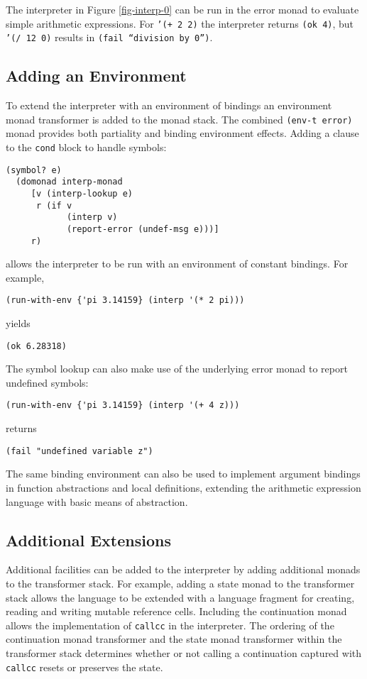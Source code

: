 \documentclass[natbib,10pt]{sigplanconf}
\begin{document}
The interpreter in Figure \ref{fig-interp-0} can be run in the error
monad to evaluate simple arithmetic expressions.  For {\tt '(+ 2 2)}
the interpreter returns {\tt (ok 4)}, but {\tt '(/ 12 0)} results in
{\tt (fail ``division by 0'')}.

\subsection{Adding an Environment}
To extend the interpreter with an environment of bindings an
environment monad transformer is added to the monad stack.  The
combined {\tt (env-t error)} monad provides both partiality and
binding environment effects.  Adding a clause to the {\tt cond} block
to handle symbols:
\begin{verbatim}
(symbol? e)
  (domonad interp-monad
     [v (interp-lookup e)
      r (if v
            (interp v)
            (report-error (undef-msg e)))]
     r)
\end{verbatim}
allows the interpreter to be run with an environment of constant
bindings.  For example,
\begin{verbatim}
(run-with-env {'pi 3.14159} (interp '(* 2 pi)))
\end{verbatim}
yields
\begin{verbatim}
(ok 6.28318)
\end{verbatim}
The symbol lookup can also make use of the underlying error monad
to report undefined symbols:
\begin{verbatim}
(run-with-env {'pi 3.14159} (interp '(+ 4 z)))
\end{verbatim}
returns
\begin{verbatim}
(fail "undefined variable z")
\end{verbatim}

The same binding environment can also be used to implement argument
bindings in function abstractions and local definitions, extending
the arithmetic expression language with basic means of abstraction.

\subsection{Additional Extensions}
Additional facilities can be added to the interpreter by adding additional
monads to the transformer stack. For example, adding a state monad to the 
transformer stack allows the language to be extended with a language 
fragment for creating, reading and writing mutable reference cells. Including 
the continuation monad allows the implementation of {\tt callcc} in the 
interpreter.  The ordering of the continuation monad transformer 
and the state monad transformer within the transformer stack determines 
whether or not calling a continuation captured with {\tt callcc} resets 
or preserves the state.
\end{document}
